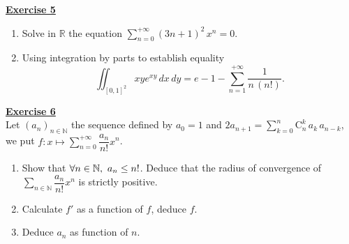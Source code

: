 \noindent\Large{\underline{\textbf{Exercise 5}}}
\normalsize{}\\
\begin{enumerate}
    \item Solve in $\mathbb{R}$ the equation $\displaystyle\sum_{n=0}^{+\infty} (3n+1)^2\, x^n = 0$.
    \item Using integration by parts to establish equality
        $$\iint_{[0,1]^2} xy e^{xy}\, dx\, dy = e - 1 - \sum_{n=1}^{+\infty} \dfrac{1}{n\,(n!)}. $$
\end{enumerate}

\noindent\Large{\underline{\textbf{Exercise 6}}}
\normalsize{}\\
\noindent Let $(a_n)_{n \in \mathbb{N}}$ the sequence defined by $a_0 = 1$ and 
$2a_{n+1} = \displaystyle\sum_{k=0}^{n} \mathrm{C}_n^k\, a_k\, a_{n-k}$, 
we put $f : x \longmapsto \displaystyle\sum_{n=0}^{+\infty} \dfrac{a_n}{n!} x^n$.
\begin{enumerate}
    \item Show that $\forall n\in\mathbb{N},\ a_n \leq n!$. Deduce that the radius of convergence of 
          $\displaystyle\sum_{n \in \mathbb{N}} \dfrac{a_n}{n!} x^n$ is strictly positive.
    \item Calculate $f'$ as a function of $f$, deduce $f$.
    \item Deduce $a_n$ as function of $n$.
\end{enumerate}
